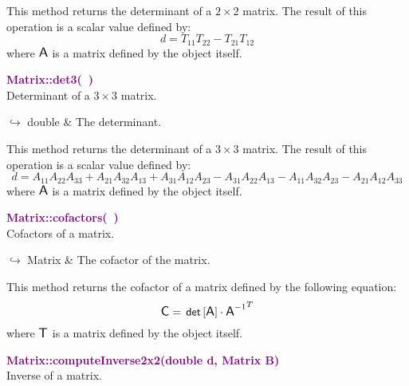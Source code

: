 This method returns the determinant of a $2 \times 2$ matrix.
The result of this operation is a scalar value defined by:
\begin{equation*}
d = T_{11} T_{22} - T_{21} T_{12}
\end{equation*}
where $\mbox{\large\ensuremath{\mathsf{A}}}$ is a matrix defined by the object itself.

\textcolor{purple}{\textbf{Matrix::det3(~)}}\label{Matrix::det3()}\\
Determinant of a $3 \times 3$ matrix.\vspace*{-0.5em}
\begin{tcolorbox}[grow to left by=-1cm, width=\textwidth-1cm,myArgs,tabularx={l|R}]
$\hookrightarrow$ double & The determinant.
\end{tcolorbox}

This method returns the determinant of a $3 \times 3$ matrix.
The result of this operation is a scalar value defined by:
\begin{equation*}
d = A_{11} A_{22} A_{33} + A_{21} A_{32} A_{13} + A_{31} A_{12} A_{23} - A_{31} A_{22} A_{13} - A_{11} A_{32} A_{23} - A_{21} A_{12} A_{33}
\end{equation*}
where $\mbox{\large\ensuremath{\mathsf{A}}}$ is a matrix defined by the object itself.

\textcolor{purple}{\textbf{Matrix::cofactors(~)}}\label{Matrix::cofactors()}\\
Cofactors of a matrix.\vspace*{-0.5em}
\begin{tcolorbox}[grow to left by=-1cm, width=\textwidth-1cm,myArgs,tabularx={l|R}]
$\hookrightarrow$ Matrix & The cofactor of the matrix.
\end{tcolorbox}

This method returns the cofactor of a matrix defined by the following equation:
\begin{equation*}
\mbox{\large\ensuremath{\mathsf{C}}} = \mbox{\ensuremath{\mathsf{\,det\,}}}[\mbox{\large\ensuremath{\mathsf{A}}}] \cdot {\mbox{\large\ensuremath{\mathsf{A}}}^{-1}}^T
\end{equation*}
where $\mbox{\large\ensuremath{\mathsf{T}}}$ is a matrix defined by the object itself.

\textcolor{purple}{\textbf{Matrix::computeInverse2x2(double d, Matrix B)}}\label{Matrix::computeInverse2x2(double d, Matrix B)}\\
Inverse of a matrix.

